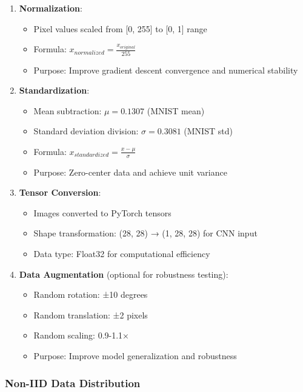 \documentclass[12pt,a4paper]{article}
\begin{document}
\begin{enumerate}
    \item \textbf{Normalization}:
    \begin{itemize}
        \item Pixel values scaled from [0, 255] to [0, 1] range
        \item Formula: $x_{normalized} = \frac{x_{original}}{255}$
        \item Purpose: Improve gradient descent convergence and numerical stability
    \end{itemize}
    
    \item \textbf{Standardization}:
    \begin{itemize}
        \item Mean subtraction: $\mu = 0.1307$ (MNIST mean)
        \item Standard deviation division: $\sigma = 0.3081$ (MNIST std)
        \item Formula: $x_{standardized} = \frac{x - \mu}{\sigma}$
        \item Purpose: Zero-center data and achieve unit variance
    \end{itemize}
    
    \item \textbf{Tensor Conversion}:
    \begin{itemize}
        \item Images converted to PyTorch tensors
        \item Shape transformation: (28, 28) → (1, 28, 28) for CNN input
        \item Data type: Float32 for computational efficiency
    \end{itemize}
    
    \item \textbf{Data Augmentation} (optional for robustness testing):
    \begin{itemize}
        \item Random rotation: ±10 degrees
        \item Random translation: ±2 pixels
        \item Random scaling: 0.9-1.1×
        \item Purpose: Improve model generalization and robustness
    \end{itemize}
\end{enumerate}

\subsubsection{Non-IID Data Distribution}
\end{document}
